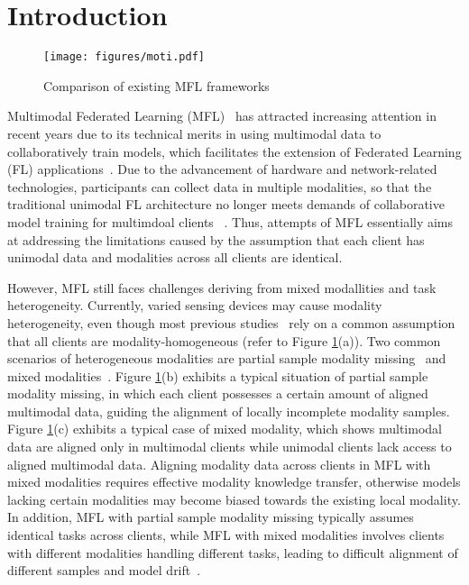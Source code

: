 \section{Introduction}
\label{sec:intro}
\begin{figure}[t]
\centering
\texttt{[image: figures/moti.pdf]} 
\caption{Comparison of existing MFL frameworks}
\label{fig:moti}
\end{figure}


Multimodal Federated Learning (MFL)~\cite{feng2023fedmultimodal,chen2024feddat,li2024federated} has attracted increasing attention in recent years due to its technical merits in using multimodal data to collaboratively train models, which facilitates the extension of Federated Learning (FL) applications~\cite{huang2023rethinking}. 
Due to the advancement of hardware and network-related technologies, participants can collect data in multiple modalities, so that the traditional unimodal FL architecture no longer meets demands of collaborative model training for multimdoal clients ~\cite{wang2025pravfed}. 
Thus, attempts of MFL essentially aims at addressing the limitations caused by the assumption that each client has unimodal data and modalities across all clients are identical.

However, MFL still faces challenges deriving from mixed modallities and task heterogeneity.  
Currently, varied sensing devices may cause modality heterogeneity, even though most previous studies~\cite{zong2021fedcmr,yan2024balancing,qi2024adaptive,li2023prototype} rely on a common assumption that all clients are modality-homogeneous (refer to Figure \ref{fig:moti}(a)).
Two common scenarios of heterogeneous modalities are partial sample modality missing~\cite{bao2023multimodal,xiong2023client} and mixed modalities~\cite{peng2024fedmm,peng2024fedmm}. 
Figure \ref{fig:moti}(b) exhibits a typical situation of partial sample modality missing, in which each client possesses a certain amount of aligned multimodal data, guiding the alignment of locally incomplete modality samples.
Figure \ref{fig:moti}(c) exhibits a typical case of mixed modality, which shows multimodal data are aligned only in multimodal clients while unimodal clients lack access to aligned multimodal data. 
Aligning modality data across clients in MFL with mixed modalities requires effective modality knowledge transfer, otherwise models lacking certain modalities may become biased towards the existing local modality. 
In addition, MFL with partial sample modality missing typically assumes identical tasks across clients, while MFL with mixed modalities involves clients with different modalities handling different tasks, leading to difficult alignment of different samples and model drift~\cite{yu2023multimodal}. 


